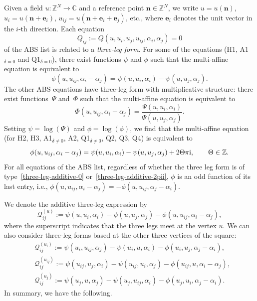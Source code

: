 \documentclass[pdftex]{sigma}
\newcommand{\C}{\mathbb{C}}
\newcommand{\Z}{\mathbb{Z}}
\renewcommand{\vec}{\boldsymbol}
\numberwithin{equation}{section}
\begin{document}
Given a field $u\colon \Z^N \to \C$ and a reference point $\vec n \in \Z^N$, we write $u = u(\vec n)$, $u_i = u(\vec n + \vec e_i)$, $u_{ij} = u(\vec n + \vec e_i + \vec e_j)$, etc., where $\vec e_i$ denotes the unit vector in the $i$-th direction.
Each equation
\[ Q_{ij} := Q(u,u_i,u_j,u_{ij}, \alpha_i, \alpha_j) = 0\]
of the ABS list is related to a \emph{three-leg form}. For some of the equations (H1, A1$_{\delta=0}$ and Q1$_{\delta=0}$), there exist functions $\psi$ and $\phi$ such that the multi-affine equation is equivalent to
\begin{equation}
 \label{three-leg-additive-0}
 \phi(u,u_{ij}, \alpha_i-\alpha_j) = \psi(u,u_i,\alpha_i) - \psi(u,u_j,\alpha_j) .
\end{equation}
The other ABS equations have three-leg form with multiplicative structure: there exist functions~$\Psi$ and~$\Phi$ such that the multi-affine equation is equivalent to
\[ \Phi(u,u_{ij}, \alpha_i-\alpha_j) = \frac{ \Psi(u,u_i,\alpha_i) }{ \Psi(u,u_j,\alpha_j) } . \]
Setting $\psi = \log(\Psi)$ and $\phi = \log(\phi)$, we find that the multi-affine equation (for H2, H3, A1$_{\delta\neq0}$, A2, Q1$_{\delta\neq0}$, Q2, Q3, Q4) is equivalent to
\begin{equation}
 \label{three-leg-additive-2pii}
 \phi(u,u_{ij}, \alpha_i-\alpha_j) = \psi(u,u_i,\alpha_i) - \psi(u,u_j,\alpha_j) + 2 \Theta \pi {\rm i}, \qquad \Theta \in \Z .
\end{equation}
For all equations of the ABS list, regardless of whether the three leg form is of type~\eqref{three-leg-additive-0} or~\eqref{three-leg-additive-2pii}, $\phi$ is an odd function of its last entry, i.e., $\phi(u,u_{ij}, \alpha_i-\alpha_j) = - \phi(u,u_{ij}, \alpha_j-\alpha_i)$.

We denote the additive three-leg expression by
\begin{equation*}
	\mathcal{Q}_{ij}^{(u)} := \psi(u,u_i,\alpha_i) - \psi(u,u_j,\alpha_j) - \phi(u,u_{ij}, \alpha_i-\alpha_j) ,
\end{equation*}
where the superscript indicates that the three legs meet at the vertex $u$. We can also consider three-leg forms based at the other three vertices of the square:
\begin{align}
	&\mathcal{Q}_{ij}^{(u_i)}:= \psi(u_i,u_{ij},\alpha_j) - \psi(u_i,u,\alpha_i) - \phi(u_i,u_j, \alpha_j-\alpha_i) , \label{quad-ui}\\
	&\mathcal{Q}_{ij}^{(u_{ij})}:= \psi(u_{ij},u_j,\alpha_i) - \psi(u_{ij},u_i,\alpha_j) - \phi(u_{ij},u, \alpha_i-\alpha_j) , \label{quad-uij}\\
	&\mathcal{Q}_{ij}^{(u_j)}:= \psi(u_j,u,\alpha_j) - \psi(u_j,u_{ij},\alpha_i) - \phi(u_j,u_i, \alpha_j-\alpha_i) . \label{quad-uj}
\end{align}
In summary, we have the following.
\end{document}
